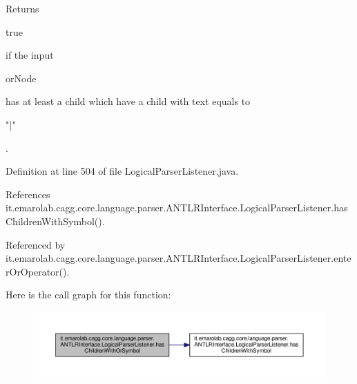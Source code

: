 \begin{DoxyReturn}{Returns}

\begin{DoxyCode}
\textcolor{keyword}{true} 
\end{DoxyCode}
 if the input
\begin{DoxyCode}
orNode 
\end{DoxyCode}
 has at least a child which have a child with text equals to
\begin{DoxyCode}
\textcolor{stringliteral}{"|"} 
\end{DoxyCode}
 . 
\end{DoxyReturn}


Definition at line 504 of file Logical\-Parser\-Listener.\-java.



References it.\-emarolab.\-cagg.\-core.\-language.\-parser.\-A\-N\-T\-L\-R\-Interface.\-Logical\-Parser\-Listener.\-has\-Children\-With\-Symbol().



Referenced by it.\-emarolab.\-cagg.\-core.\-language.\-parser.\-A\-N\-T\-L\-R\-Interface.\-Logical\-Parser\-Listener.\-enter\-Or\-Operator().



Here is the call graph for this function\-:\nopagebreak
\begin{figure}[H]
\begin{center}
\leavevmode
\includegraphics[width=350pt]{classit_1_1emarolab_1_1cagg_1_1core_1_1language_1_1parser_1_1ANTLRInterface_1_1LogicalParserListener_ae42ff30221c66777373d5a81de6e224a_cgraph}
\end{center}
\end{figure}



